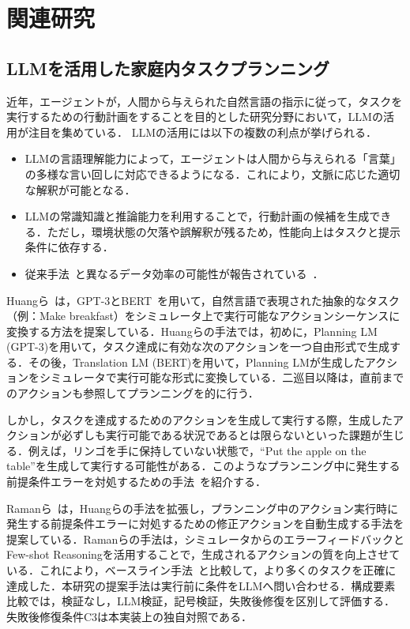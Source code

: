 \section{関連研究}\label{sec2}

\subsection{LLMを活用した家庭内タスクプランニング}\label{sec2.1}
近年，エージェントが，人間から与えられた自然言語の指示に従って，タスクを実行するための行動計画をすることを目的とした研究分野において，LLMの活用が注目を集めている．
LLMの活用には以下の複数の利点が挙げられる．
\begin{itemize}
    \item LLMの言語理解能力によって，エージェントは人間から与えられる「言葉」の多様な言い回しに対応できるようになる．これにより，文脈に応じた適切な解釈が可能となる．
    \item LLMの常識知識と推論能力を利用することで，行動計画の候補を生成できる．ただし，環境状態の欠落や誤解釈が残るため，性能向上はタスクと提示条件に依存する．
    \item 従来手法~\cite{zhang-chai-2021-hierarchical,pmlr-v164-blukis22a}と異なるデータ効率の可能性が報告されている~\cite{song2023llm}．
\end{itemize}

Huangら~\cite{huang22}は，GPT-3とBERT~\cite{devlin2018bert}を用いて，自然言語で表現された抽象的なタスク（例：Make breakfast）をシミュレータ上で実行可能なアクションシーケンスに変換する方法を提案している．Huangらの手法では，初めに，Planning LM (GPT-3)を用いて，タスク達成に有効な次のアクションを一つ自由形式で生成する．その後，Translation LM (BERT)を用いて，Planning LMが生成したアクションをシミュレータで実行可能な形式に変換している．二巡目以降は，直前までのアクションも参照してプランニングを的に行う．

しかし，タスクを達成するためのアクションを生成して実行する際，生成したアクションが必ずしも実行可能である状況であるとは限らないといった課題が生じる．例えば，リンゴを手に保持していない状態で，``Put the apple on the table''を生成して実行する可能性がある．このようなプランニング中に発生する前提条件エラーを対処するための手法~\cite{raman2024cape}を紹介する．

Ramanら~\cite{raman2024cape}は，Huangらの手法を拡張し，プランニング中のアクション実行時に発生する前提条件エラーに対処するための修正アクションを自動生成する手法を提案している．Ramanらの手法は，シミュレータからのエラーフィードバックとFew-shot Reasoningを活用することで，生成されるアクションの質を向上させている．これにより，ベースライン手法~\cite{ahn2022can,huang22}と比較して，より多くのタスクを正確に達成した．本研究の提案手法は実行前に条件をLLMへ問い合わせる．構成要素比較では，検証なし，LLM検証，記号検証，失敗後修復を区別して評価する．失敗後修復条件C3は本実装上の独自対照である．

